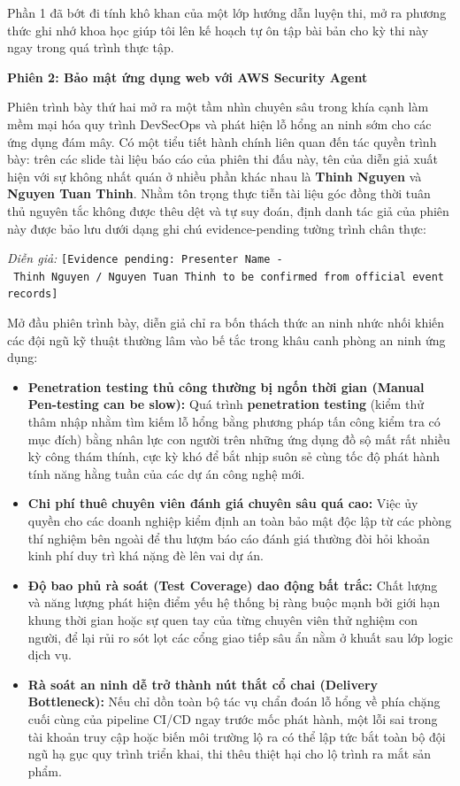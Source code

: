 Phần 1 đã bớt đi tính khô khan của một lớp hướng dẫn luyện thi, mở ra
phương thức ghi nhớ khoa học giúp tôi lên kế hoạch tự ôn tập bài bản cho
kỳ thi này ngay trong quá trình thực tập.

\vspace{0.5em}\noindent\textbf{Phiên 2: Bảo mật ứng dụng web với AWS Security
Agent}\par

Phiên trình bày thứ hai mở ra một tầm nhìn chuyên sâu trong khía cạnh
làm mềm mại hóa quy trình DevSecOps và phát hiện lỗ hổng an ninh sớm cho
các ứng dụng đám mây. Có một tiểu tiết hành chính liên quan đến tác
quyền trình bày: trên các slide tài liệu báo cáo của phiên thi đấu này,
tên của diễn giả xuất hiện với sự không nhất quán ở nhiều phần khác nhau
là \textbf{Thinh Nguyen} và \textbf{Nguyen Tuan Thinh}. Nhằm tôn trọng
thực tiễn tài liệu góc đồng thời tuân thủ nguyên tắc không được thêu dệt
và tự suy đoán, định danh tác giả của phiên này được bảo lưu dưới dạng
ghi chú evidence-pending tường trình chân thực:

\emph{Diễn giả:}
\texttt{{[}Evidence\ pending:\ Presenter\ Name\ -\ Thinh\ Nguyen\ /\ Nguyen\ Tuan\ Thinh\ to\ be\ confirmed\ from\ official\ event\ records{]}}

Mở đầu phiên trình bày, diễn giả chỉ ra bốn thách thức an ninh nhức nhối
khiến các đội ngũ kỹ thuật thường lâm vào bế tắc trong khâu canh phòng
an ninh ứng dụng:

\begin{itemize}
\tightlist
\item
  \textbf{Penetration testing thủ công thường bị ngốn thời gian (Manual
  Pen-testing can be slow):} Quá trình \textbf{penetration testing}
  (kiểm thử thâm nhập nhằm tìm kiếm lỗ hổng bằng phương pháp tấn công
  kiểm tra có mục đích) bằng nhân lực con người trên những ứng dụng đồ
  sộ mất rất nhiều kỳ công thám thính, cực kỳ khó để bắt nhịp suôn sẻ
  cùng tốc độ phát hành tính năng hằng tuần của các dự án công nghệ mới.
\item
  \textbf{Chi phí thuê chuyên viên đánh giá chuyên sâu quá cao:} Việc ủy
  quyền cho các doanh nghiệp kiểm định an toàn bảo mật độc lập từ các
  phòng thí nghiệm bên ngoài để thu lượm báo cáo đánh giá thường đòi hỏi
  khoản kinh phí duy trì khá nặng đè lên vai dự án.
\item
  \textbf{Độ bao phủ rà soát (Test Coverage) dao động bất trắc:} Chất
  lượng và năng lượng phát hiện điểm yếu hệ thống bị ràng buộc mạnh bởi
  giới hạn khung thời gian hoặc sự quen tay của từng chuyên viên thử
  nghiệm con người, để lại rủi ro sót lọt các cổng giao tiếp sâu ẩn nằm
  ở khuất sau lớp logic dịch vụ.
\item
  \textbf{Rà soát an ninh dễ trở thành nút thắt cổ chai (Delivery
  Bottleneck):} Nếu chỉ dồn toàn bộ tác vụ chẩn đoán lỗ hổng về phía
  chặng cuối cùng của pipeline CI/CD ngay trước mốc phát hành, một lỗi
  sai trong tài khoản truy cập hoặc biến môi trường lộ ra có thể lập tức
  bắt toàn bộ đội ngũ hạ gục quy trình triển khai, thi thêu thiệt hại
  cho lộ trình ra mắt sản phẩm.
\end{itemize}

